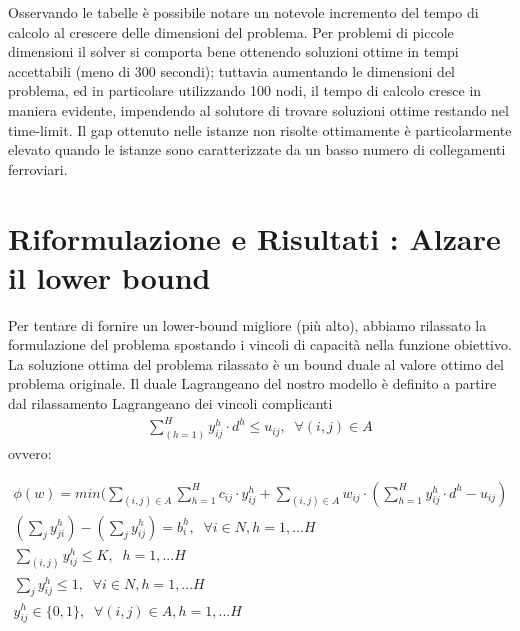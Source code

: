 \documentclass{article}
\begin{document}
Osservando le tabelle è possibile notare un notevole incremento del tempo di calcolo al crescere delle dimensioni del problema. Per problemi di piccole dimensioni il solver si comporta bene ottenendo soluzioni ottime in tempi accettabili (meno di 300 secondi); tuttavia aumentando le dimensioni del problema, ed in particolare utilizzando 100 nodi, il tempo di calcolo cresce in maniera evidente, impendendo al solutore di trovare soluzioni ottime restando nel time-limit. 
Il gap ottenuto nelle istanze non risolte ottimamente è particolarmente elevato quando le istanze sono caratterizzate da un basso numero di collegamenti ferroviari.


\section{Riformulazione e Risultati : Alzare il lower bound}

 Per tentare di fornire un lower-bound migliore (più alto), abbiamo rilassato la formulazione del problema spostando i vincoli di capacità nella funzione obiettivo. La soluzione ottima del problema rilassato è un bound duale al valore ottimo del problema originale.
Il duale Lagrangeano del nostro modello è definito a partire dal rilassamento Lagrangeano dei vincoli complicanti 
\begin{align}
    \sum_{(h=1)}^H y_{ij}^h \cdot d^h \leq u_{ij}, \; \; \forall (i,j) \in A
    \label{eq:vcap}
\end{align}
ovvero:

\begin{align}
    \phi(w) = min (\sum_{(i,j) \in A}\sum_{h=1}^H c_{ij} \cdot y_{ij}^h + \sum_{(i,j) \in A} w_{ij} \cdot(\sum_{h=1}^H y_{ij}^h \cdot d^h - u_{ij})
    \label{mod:lagobj}
    \\
    (\sum_{j}y_{ji}^h)- (\sum_{j}y_{ij}^h ) = b_i^h, \; \; \forall i \in N, h=1, ... H
    \label{mod:lagv2}
    \\
    \sum_{(i,j)} y_{ij}^h  \leq K, \; \; h=1, ... H
    \label{mod:lagv4}
    \\
    \sum_{j} y_{ij}^h \leq 1, \; \; \forall i \in \textit{N} , h=1, ... H
    \label{mod:lagv5}
    \\
     y_{ij}^h \in \{0,1\}, \; \; \forall (i,j) \in A, h=1, ... H
    \label{mod:lag}
\end{align}
\end{document}
